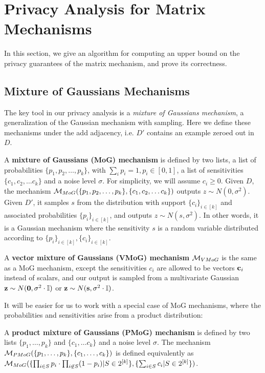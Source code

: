 \section{Privacy Analysis for Matrix Mechanisms}\label{sec:cptb}


In this section, we give an algorithm for computing an upper bound on the privacy guarantees of the matrix mechanism, and prove its correctness.

\subsection{Mixture of Gaussians Mechanisms}

The key tool in our privacy analysis is a \textit{mixture of Gaussians mechanism}, a generalization of the Gaussian mechanism with sampling. Here we define these mechanisms under the add adjacency, i.e. $D'$ contains an example zeroed out in $D$.

\begin{defn}\label{def:mog}
A \textbf{mixture of Gaussians (MoG) mechanism} is defined by two lists, a list of probabilities $\{p_1, p_2, \ldots, p_k\}$, with $\sum_i p_i = 1, p_i \in [0, 1]$, a list of sensitivities $\{c_1, c_2, \ldots c_k\}$ and a noise level $\sigma$. For simplicity, we will assume $c_i \geq 0$. Given $D$, the mechanism $\mathcal{M}_{MoG}(\{p_1, p_2, \ldots, p_k\}, \{c_1, c_2, \ldots c_k\})$ outputs $z \sim N(0, \sigma^2)$. Given $D'$, it samples $s$ from the distribution with support $\{c_i\}_{i \in [k]}$ and associated probabilities $\{p_i\}_{i \in [k]}$, and outputs $z \sim N(s, \sigma^2)$. In other words, it is a Gaussian mechanism where the sensitivity $s$ is a random variable distributed according to $\{p_i\}_{i \in [k]}, \{c_i\}_{i \in [k]}$. 

A \textbf{vector mixture of Gaussians (VMoG) mechanism} $\mathcal{M}_{VMoG}$ is the same as a MoG mechanism, except the sensitivities $c_i$ are allowed to be vectors $\mathbf{c}_i$ instead of scalars, and our output is sampled from a multivariate Gaussian $\mathbf{z} \sim N(\boldsymbol{0}, \sigma^2 \cdot \mathbb{I})$ or $\mathbf{z} \sim N(\mathbf{s}, \sigma^2 \cdot \mathbb{I})$. 
\end{defn}

It will be easier for us to work with a special case of MoG mechanisms, where the probabilities and sensitivities arise from a product distribution:

\begin{defn}
A \textbf{product mixture of Gaussians (PMoG) mechanism} is defined by two lists $\{p_1,\ldots, p_k\}$ and $\{c_1,\ldots c_k\}$ and a noise level $\sigma$. The mechanism $\mathcal{M}_{PMoG}(\{p_1,\ldots, p_k\}, \{c_1,\ldots, c_k\})$ is defined equivalently as $\mathcal{M}_{MoG}(\{\prod_{i \in S} p_i \cdot \prod_{i \not \in S} (1 - p_i) | S \in 2^{[k]}\}, \{\sum_{i \in S} c_i | S \in 2^{[k]}\})$.
\end{defn}

